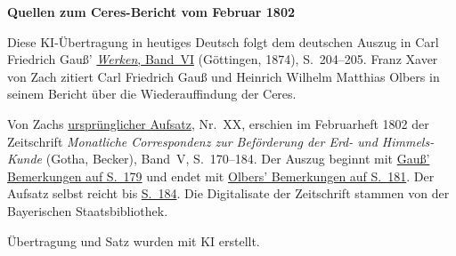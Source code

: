 \clearpage\thispagestyle{empty}
\begin{center}\textbf{Quellen zum Ceres-Bericht vom Februar 1802}\end{center}
\noindent Diese KI-Übertragung in heutiges Deutsch folgt dem deutschen Auszug in Carl Friedrich Gauß’ \href{https://gdz.sub.uni-goettingen.de/id/PPN236007467}{\textit{Werken}, Band~VI} (Göttingen, 1874), S.~204--205. Franz Xaver von Zach zitiert Carl Friedrich Gauß und Heinrich Wilhelm Matthias Olbers in seinem Bericht über die Wiederauffindung der Ceres.
\par\smallskip\noindent Von Zachs \href{https://api.digitale-sammlungen.de/iiif/image/v2/bsb10538597_00178/full/1450,/0/default.jpg}{ursprünglicher Aufsatz}, Nr.~XX, erschien im Februarheft 1802 der Zeitschrift \textit{Monatliche Correspondenz zur Beförderung der Erd- und Himmels-Kunde} (Gotha, Becker), Band~V, S.~170--184. Der Auszug beginnt mit \href{https://api.digitale-sammlungen.de/iiif/image/v2/bsb10538597_00187/full/1450,/0/default.jpg}{Gauß’ Bemerkungen auf S.~179} und endet mit \href{https://api.digitale-sammlungen.de/iiif/image/v2/bsb10538597_00189/full/1450,/0/default.jpg}{Olbers’ Bemerkungen auf S.~181}. Der Aufsatz selbst reicht bis \href{https://api.digitale-sammlungen.de/iiif/image/v2/bsb10538597_00192/full/1450,/0/default.jpg}{S.~184}. Die Digitalisate der Zeitschrift stammen von der Bayerischen Staatsbibliothek.
\par\smallskip\noindent Übertragung und Satz wurden mit KI erstellt.
\clearpage
